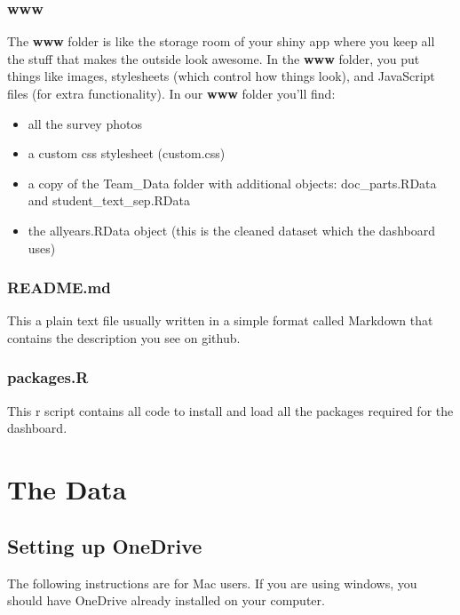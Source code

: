 \documentclass[
]{book}
\begin{document}
\hypertarget{www}{%
\subsection{www}\label{www}}

The \textbf{www} folder is like the storage room of your shiny app where you keep all the stuff that makes the outside look awesome. In the \textbf{www} folder, you put things like images, stylesheets (which control how things look), and JavaScript files (for extra functionality). In our \textbf{www} folder you'll find:

\begin{itemize}
\item
  all the survey photos
\item
  a custom css stylesheet (custom.css)
\item
  a copy of the Team\_Data folder with additional objects: doc\_parts.RData and student\_text\_sep.RData
\item
  the allyears.RData object (this is the cleaned dataset which the dashboard uses)
\end{itemize}

\hypertarget{readme.md}{%
\subsection{README.md}\label{readme.md}}

This a plain text file usually written in a simple format called Markdown that contains the description you see on github.

\hypertarget{packages.r}{%
\subsection{packages.R}\label{packages.r}}

This r script contains all code to install and load all the packages required for the dashboard.

\hypertarget{the-data}{%
\chapter{The Data}\label{the-data}}

\hypertarget{setting-up-onedrive}{%
\section{Setting up OneDrive}\label{setting-up-onedrive}}

The following instructions are for Mac users. If you are using windows, you should have OneDrive already installed on your computer.
\end{document}
